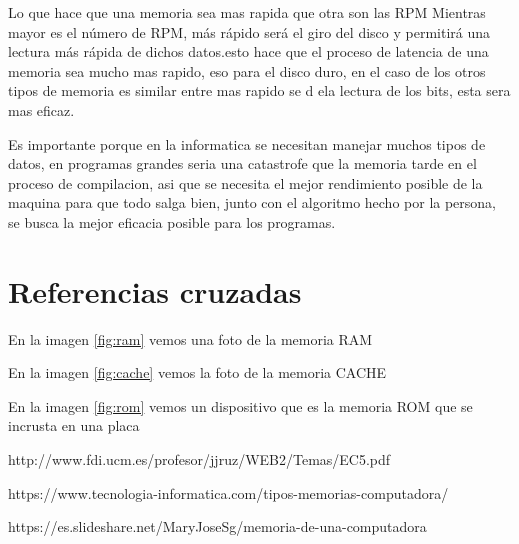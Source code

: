 \documentclass{article}
\begin{document}
Lo que hace que una memoria sea mas rapida que otra son las RPM Mientras mayor es el número de RPM, más rápido será el giro del disco y permitirá una lectura más rápida de dichos datos.esto hace que el proceso de latencia de una memoria sea mucho mas rapido, eso para el disco duro, en el caso de los otros tipos de memoria es similar entre mas rapido se d ela lectura de los bits, esta sera mas eficaz.

Es importante porque en la informatica se necesitan manejar muchos tipos de datos, en programas grandes seria una catastrofe que la memoria tarde en el proceso de compilacion, asi que se necesita el mejor rendimiento posible de la maquina para que todo salga bien, junto con el algoritmo hecho por la persona, se busca la mejor eficacia posible para los programas.


\section*{Referencias cruzadas}

En la imagen \ref{fig:ram} vemos una foto de la memoria RAM

En la imagen \ref{fig:cache} vemos la foto de la memoria CACHE

En la imagen \ref{fig:rom} vemos un dispositivo que es la memoria        ROM que se incrusta en una placa




http://www.fdi.ucm.es/profesor/jjruz/WEB2/Temas/EC5.pdf

https://www.tecnologia-informatica.com/tipos-memorias-computadora/

https://es.slideshare.net/MaryJoseSg/memoria-de-una-computadora
\end{document}
